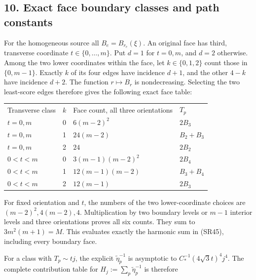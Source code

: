 \documentclass[11pt]{article}
\begin{document}
\subsection*{10. Exact face boundary classes and path constants}

For the homogeneous source all \(B_e=B_{r_e}(\xi)\). An original face has third, transverse coordinate \(t\in\{0,\ldots,m\}\). Put \(d=1\) for \(t=0,m\), and \(d=2\) otherwise. Among the two lower coordinates within the face, let \(k\in\{0,1,2\}\) count those in \(\{0,m-1\}\). Exactly \(k\) of its four edges have incidence \(d+1\), and the other \(4-k\) have incidence \(d+2\). The function \(r\mapsto B_r\) is nondecreasing. Selecting the two least-score edges therefore gives the following exact face table:

\begingroup\small\setlength{\tabcolsep}{3pt}\begin{longtable}{@{}p{}p{}p{}p{}@{}}\toprule
Transverse class & \(k\) & Face count, all three orientations & \(T_p\)\\
\(t=0,m\) & 0 & \(6(m-2)^2\) & \(2B_3\)\\
\(t=0,m\) & 1 & \(24(m-2)\) & \(B_2+B_3\)\\
\(t=0,m\) & 2 & \(24\) & \(2B_2\)\\
\(0<t<m\) & 0 & \(3(m-1)(m-2)^2\) & \(2B_4\)\\
\(0<t<m\) & 1 & \(12(m-1)(m-2)\) & \(B_3+B_4\)\\
\(0<t<m\) & 2 & \(12(m-1)\) & \(2B_3\)\\
\bottomrule\end{longtable}\endgroup

For fixed orientation and \(t\), the numbers of the two lower-coordinate choices are \((m-2)^2,4(m-2),4\). Multiplication by two boundary levels or \(m-1\) interior levels and three orientations proves all six counts. They sum to \(3m^2(m+1)=M\). This evaluates exactly the harmonic sum in (SR45), including every boundary face.

For a class with \(T_p\sim tj\), the explicit \(\widetilde\eta_p^{-1}\) is asymptotic to \(C_*^{-1}(4\sqrt3t)^4j^4\). The complete contribution table for \(H_j:=\sum_p\widetilde\eta_p^{-1}\) is therefore
\end{document}
